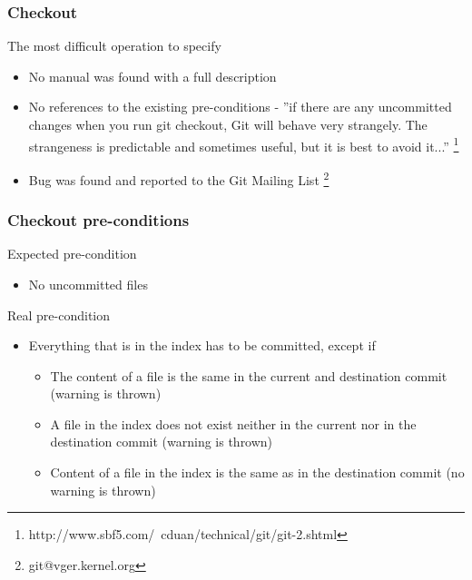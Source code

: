 \documentclass{beamer}
\begin{document}
\begin{frame}[fragile]
	\frametitle{Checkout}
	\begin{block}{The most difficult operation to specify}
	\begin{itemize}
		\item No manual was found with a full description
		\item No references to the existing pre-conditions - ''if there
      are any uncommitted changes when you run git checkout, Git will
      behave very strangely. The strangeness is predictable and
      sometimes useful, but it is best to avoid it...''
      \footnote{http://www.sbf5.com/~cduan/technical/git/git-2.shtml}
		\item Bug was found and reported to the Git Mailing List
      \footnote{git@vger.kernel.org}
	\end{itemize}
	\end{block}
\end{frame}

\begin{frame}
	\frametitle{Checkout pre-conditions}
	\begin{block}{Expected pre-condition}
	\begin{itemize}
		\item No uncommitted files
	\end{itemize}
	\end{block}
	\begin{block}{Real pre-condition}
	\begin{itemize}
		\item Everything that is in the index has to be
		committed, except if
		\begin{itemize}
		\item The content of a file is the same in the current
		and destination commit (warning is thrown)
		\item A file in the index does not
		exist neither in the current nor in the destination commit
		(warning is thrown)
		\item Content of a file in the index is the same as in the
		destination commit (no warning is thrown)
		\end{itemize}
	\end{itemize}
	\end{block}
\end{frame}
\end{document}
